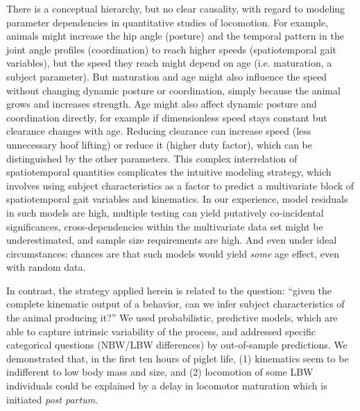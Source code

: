 There is a conceptual hierarchy, but no clear causality, with regard to modeling parameter dependencies in quantitative studies of locomotion.
For example, animals might increase the hip angle (posture) and the temporal pattern in the joint angle profiles (coordination) to reach higher speeds (spatiotemporal gait variables), but the speed they reach might depend on age (i.e. maturation, a subject parameter).
But maturation and age might also influence the speed without changing dynamic posture or coordination, simply because the animal grows and increases strength.
Age might also affect dynamic posture and coordination directly, for example if dimensionless speed stays constant but clearance changes with age.
Reducing clearance can increase speed (less unnecessary hoof lifting) or reduce it (higher duty factor), which can be distinguished by the other parameters.
This complex interrelation of spatiotemporal quantities complicates the intuitive modeling strategy, which involves using subject characteristics as a factor to predict a multivariate block of spatiotemporal gait variables and kinematics.
In our experience, model residuals in such models are high, multiple testing can yield putatively co-incidental significances, cross-dependencies within the multivariate data set might be underestimated, and sample size requirements are high.
And even under ideal circumstances: chances are that such models would yield \emph{some} age effect, even with random data.

\medskip
In contrast, the strategy applied herein is related to the question: ``given the complete kinematic output of a behavior, can we infer subject characteristics of the animal producing it?''
We used probabilistic, predictive models, which are able to capture intrinsic variability of the process, and addressed specific categorical questions (NBW/LBW differences) by out-of-sample predictions.
We demonstrated that, in the first ten hours of piglet life, (1) kinematics seem to be indifferent to low body mass and size, and (2) locomotion of some LBW individuals could be explained by a delay in locomotor maturation which is initiated \emph{post partum}.


\clearpage
